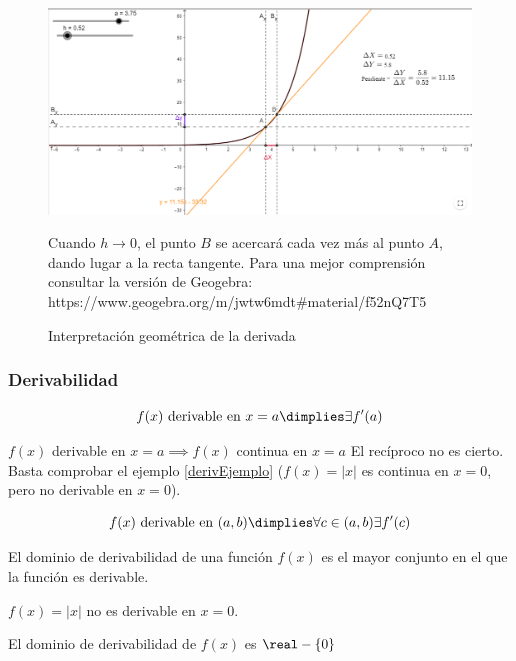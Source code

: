 \begin{figure}[hbp]
\centering
\includegraphics[scale=0.5]{img/DerivadaInterGeometrica}
\label{fig::funinterpretacionderivadapunto}
\caption{Interpretación geométrica de la derivada} Cuando $h\to0$, el punto $B$ se acercará cada vez más al punto $A$, dando lugar a la recta tangente. 
%
Para una mejor comprensión consultar la versión de Geogebra: https://www.geogebra.org/m/jwtw6mdt\#material/f52nQ7T5

\end{figure} 


\subsubsection{Derivabilidad}
\begin{defn}
\[f(x) \text{ derivable en } x=a\dimplies \exists f'(a)\]
\end{defn}

\begin{prop}
$f(x)$ derivable en $x=a \implies f(x)$ continua en $x=a$
\obs El recíproco no es cierto. Basta comprobar el ejemplo \ref{derivEjemplo} ($f(x) = |x|$ es continua en $x=0$, pero no derivable en $x=0$).
\end{prop}

\begin{defn}
\[f(x) \text{ derivable en } (a,b) \dimplies \forall c\in(a,b) \exists f'(c) \]
\end{defn}

\begin{defn}
El dominio de derivabilidad de una función $f(x)$ es el mayor conjunto en el que la función es derivable.
\end{defn}

\begin{example}
$f(x) = |x|$ no es derivable en $x=0$.

El dominio de derivabilidad de $f(x)$ es $\real-\{0\}$
\end{example}



